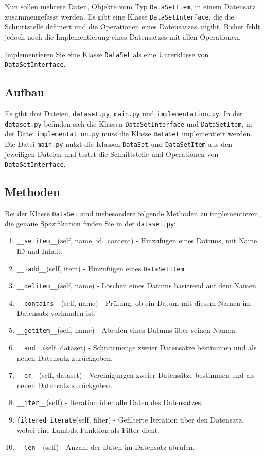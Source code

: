 \documentclass[12pt]{article}
\begin{document}
Nun sollen mehrere Daten, Objekte vom Typ \texttt{DataSetItem}, in einem Datensatz zusammengefasst werden. Es gibt eine Klasse \texttt{DataSetInterface}, die die Schnittstelle definiert und die Operationen eines Datensatzes angibt. Bisher fehlt jedoch noch die Implementierung eines Datensatzes mit allen Operationen.

Implementieren Sie eine Klasse \texttt{DataSet} als eine Unterklasse von \texttt{DataSetInterface}.

\subsection{Aufbau}
Es gibt drei Dateien, \texttt{dataset.py}, \texttt{main.py} und \texttt{implementation.py}. In der \texttt{dataset.py} befinden sich die Klassen \texttt{DataSetInterface} und \texttt{DataSetItem}, in der Datei \texttt{implementation.py} muss die Klasse \texttt{DataSet} implementiert werden. Die Datei \texttt{main.py} nutzt die Klassen \texttt{DataSet} und \texttt{DataSetItem} aus den jeweiligen Dateien und testet die Schnittstelle und Operationen von
\texttt{DataSetInterface}.

\subsection{Methoden}
Bei der Klasse \texttt{DataSet} sind insbesondere folgende Methoden zu implementieren, die genaue Spezifikation finden Sie in der \texttt{dataset.py}:

\begin{enumerate}
    \item \texttt{\_\_setitem\_\_}(self, name, id\_content) - Hinzufügen eines Datums, mit Name, ID und Inhalt.
    \item \texttt{\_\_iadd\_\_}(self, item) - Hinzufügen eines \texttt{DataSetItem}.
    \item \texttt{\_\_delitem\_\_}(self, name) - Löschen eines Datums basierend auf dem Namen.
    \item \texttt{\_\_contains\_\_}(self, name) - Prüfung, ob ein Datum mit diesem Namen im Datensatz vorhanden ist.
    \item \texttt{\_\_getitem\_\_}(self, name) - Abrufen eines Datums über seinen Namen.
    \item \texttt{\_\_and\_\_}(self, dataset) - Schnittmenge zweier Datensätze bestimmen und als neuen Datensatz zurückgeben.
    \item \texttt{\_\_or\_\_}(self, dataset) - Vereinigungen zweier Datensätze bestimmen und als neuen Datensatz zurückgeben.
    \item \texttt{\_\_iter\_\_}(self) - Iteration über alle Daten des Datensatzes.
    \item \texttt{filtered\_iterate}(self, filter) - Gefilterte Iteration über den Datensatz, wobei eine Lambda-Funktion als Filter dient.
    \item \texttt{\_\_len\_\_}(self) - Anzahl der Daten im Datensatz abrufen.
\end{enumerate}
\end{document}
